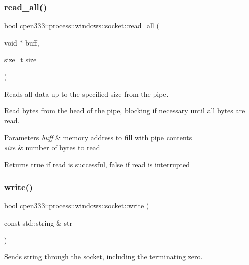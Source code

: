 \subsubsection{\texorpdfstring{read\+\_\+all()}{read\_all()}}
{\footnotesize\ttfamily bool cpen333\+::process\+::windows\+::socket\+::read\+\_\+all (\begin{DoxyParamCaption}\item[{void $\ast$}]{buff,  }\item[{size\+\_\+t}]{size }\end{DoxyParamCaption})\hspace{0.3cm}{\ttfamily [inline]}}



Reads all data up to the specified size from the pipe. 

Read bytes from the head of the pipe, blocking if necessary until all bytes are read.


\begin{DoxyParams}{Parameters}
{\em buff} & memory address to fill with pipe contents \\
\hline
{\em size} & number of bytes to read \\
\hline
\end{DoxyParams}
\begin{DoxyReturn}{Returns}
true if read is successful, false if read is interrupted 
\end{DoxyReturn}
\mbox{\label{classcpen333_1_1process_1_1windows_1_1socket_add8c60c2bff8d2c4339e38e2bb92f6d7}} 
\subsubsection{\texorpdfstring{write()}{write()}\hspace{0.1cm}{\footnotesize\ttfamily [1/2]}}
{\footnotesize\ttfamily bool cpen333\+::process\+::windows\+::socket\+::write (\begin{DoxyParamCaption}\item[{const std\+::string \&}]{str }\end{DoxyParamCaption})\hspace{0.3cm}{\ttfamily [inline]}}



Sends string through the socket, including the terminating zero. 

